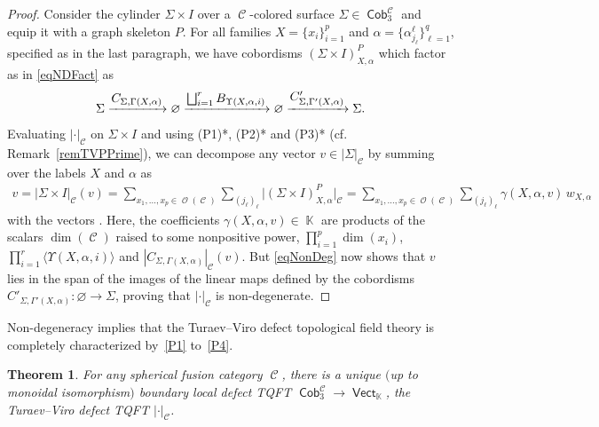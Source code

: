 \documentclass[10pt,a4paper]{amsart}
\DeclareMathOperator{\vect}{\mathsf{Vect}}
\DeclareMathOperator{\K}{\mathbb{K}}
\DeclareMathOperator{\Cob}{\mathsf{Cob}}
\DeclareMathOperator{\calc}{\mathcal{C}}
\DeclareMathOperator{\calo}{\mathcal{O}}
\numberwithin{equation}{section}
\newtheorem{Theorem}{Theorem}[section]
\theoremstyle{definition}
\begin{document}
\begin{proof}
 Consider the cylinder $\Sigma \times I$ over a $\calc$-colored surface $\Sigma \in \Cob_3^{\calc}$ and equip it with a graph skeleton $P$.
 For all families $X = \{x_i\}_{i = 1}^p$ and $\alpha = \{\alpha_{j_{\ell}}^{\ell}\}_{\ell = 1}^q$, specified as in the last paragraph, we have cobordisms $(\Sigma \times I)_{X, \alpha}^P$ which factor as in \eqref{eqNDFact} as
 \begin{align*}
 \Sigma \xrightarrow{\mbox{\normalsize$C_{\Sigma, \Gamma(X, \alpha)}$}} \varnothing \xrightarrow{\mbox{\normalsize$\bigsqcup_{i = 1}^rB_{\Upsilon(X, \alpha, i)}$}} \varnothing \xrightarrow{\mbox{\normalsize$C'_{\Sigma, \Gamma'(X, \alpha)}$}} \Sigma.
 \end{align*}
 Evaluating $|\cdot|_{\calc}$ on $\Sigma \times I$ and using (P1)*, (P2)* and (P3)* (cf. Remark~\ref{remTVPPrime}), we can decompose any vector $v \in |\Sigma|_{\calc}$ by summing over the labels $X$ and $\alpha$ as
 \begin{align}
 \label{eqNonDeg}
 v = |\Sigma \times I|_{\calc}(v) = \sum_{x_1, \dots, x_p \in \calo(\calc)} \sum_{(j_{\ell})_{\ell}}\bigl|(\Sigma \times I)_{X, \alpha}^P\bigr|_{\calc} = \sum_{x_1, \dots, x_p \in \calo(\calc)} \sum_{(j_{\ell})_{\ell}} \gamma(X, \alpha, v)\,w_{X, \alpha}
 \end{align}
 with the vectors \smash{$w_{X, \alpha} = |C'_{\Sigma, \Gamma'(X, \alpha)}|_{\calc}(1) \in |\Sigma|_{\calc}$}. Here, the coefficients $\gamma(X, \alpha, v) \in \K$ are products of the scalars $\dim(\calc)$ raised to some nonpositive power, $\prod_{i = 1}^p\dim(x_i)$, $\prod_{i = 1}^r\langle\Upsilon(X, \alpha, i)\rangle $ and $|C_{\Sigma, \Gamma(X, \alpha)}|_{\calc}(v)$. But \eqref{eqNonDeg} now shows that $v$ lies in the span of the images of the linear maps defined by the cobordisms $C'_{\Sigma, \Gamma'(X, \alpha)}\colon \varnothing \rightarrow \Sigma$, proving that $|\cdot|_{\calc}$ is non-degenerate.
\end{proof}

Non-degeneracy implies that the Turaev--Viro defect topological field theory is completely characterized by~\ref{P1} to~\ref{P4}.

\begin{Theorem}\label{thmComb}
For any spherical fusion category $\calc$, there is a unique $($up to monoidal iso\-mor\-phism$)$ boundary local defect TQFT $\Cob_3^{\calc} \rightarrow \vect_{\K}$, the Turaev--Viro defect TQFT $|\cdot|_{\calc}$.
\end{Theorem}
\end{document}
